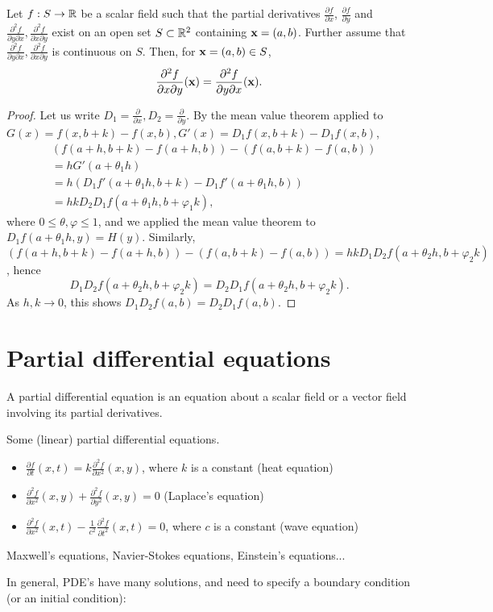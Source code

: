 \begin{theorem}%
    \label{thm:equal-double-partial}
    Let \(f:S\to\mathbb{R}\) be a scalar field such that the partial derivatives \(\frac{\partial f}{\partial x }\), \(\frac{\partial f}{\partial y}\) and \(\frac{\partial^2 f}{\partial y \partial x}, \frac{\partial^2 f}{\partial x \partial y} \) exist on an open set \(S\subset \mathbb{R}^2\) containing \(\mathbf{x} = (a,b)\).
    Further assume that \(\frac{\partial^2 f}{\partial y \partial x}, \frac{\partial^2 f}{\partial x \partial y} \) is continuous on \(S\).
    Then, for $\mathbf{x} = (a,b) \in S$,
    \[
        \frac{\partial^2 f}{\partial x \partial y} (\mathbf{x})=\frac{\partial^2 f}{\partial y \partial x} (\mathbf{x}).
    \]
\end{theorem}
\begin{proof}
 Let us write $D_1 = \frac{\partial}{\partial x}, D_2 = \frac{\partial}{\partial y}$.
 By the mean value theorem applied to $G(x) = f(x,b+k) - f(x,b), G'(x) = D_1 f(x,b+k) - D_1 f(x,b)$,
 \begin{align*}
  &(f(a+h,b+k) - f(a+h,b)) - (f(a,b+k) - f(a,b)) \\
  &= h G'(a+\theta_1 h) \\
  &= h (D_1 f'(a+\theta_1 h, b+k) - D_1 f'(a+\theta_1 h, b)) \\
  &= hk D_2 D_1f(a+\theta_1 h, b+\varphi_1 k),
 \end{align*}
 where $0\le \theta, \varphi \le 1$, and we applied the mean value theorem to $D_1 f(a+\theta_1 h, y) = H(y)$.
 Similarly,
 $(f(a+h,b+k) - f(a+h,b)) - (f(a,b+k) - f(a,b)) = hk D_1 D_2f(a+\theta_2 h, b+\varphi_2 k)$,
 hence
 \[
  D_1 D_2 f(a+\theta_2 h, b+\varphi_2 k) = D_2 D_1f(a+\theta_2 h, b+\varphi_2 k).
 \]
 As $h,k\to 0$, this shows $D_1 D_2 f(a,b) = D_2 D_1 f(a,b)$.
\end{proof}


\section{Partial differential equations}
A partial differential equation is an equation about a scalar field or a vector field
involving its partial derivatives.
\begin{example}
 Some (linear) partial differential equations.
 \begin{itemize}
  \item $\frac{\partial f}{\partial t}(x,t) = k\frac{\partial^2 f}{\partial x^2}(x,y)$, where $k$ is a constant (heat equation)
  \item $\frac{\partial^2 f}{\partial x^2}(x,y) + \frac{\partial^2 f}{\partial y^2}(x,y) = 0$ (Laplace's equation)
  \item $\frac{\partial^2 f}{\partial x^2}(x,t) - \frac1{c^2}\frac{\partial^2 f}{\partial t^2}(x,t) = 0$, where $c$ is a constant (wave equation)
 \end{itemize}
 Maxwell's equations, Navier-Stokes equations, Einstein's equations...
\end{example}
In general, PDE's have many solutions, and need to specify a boundary condition (or an initial condition):

